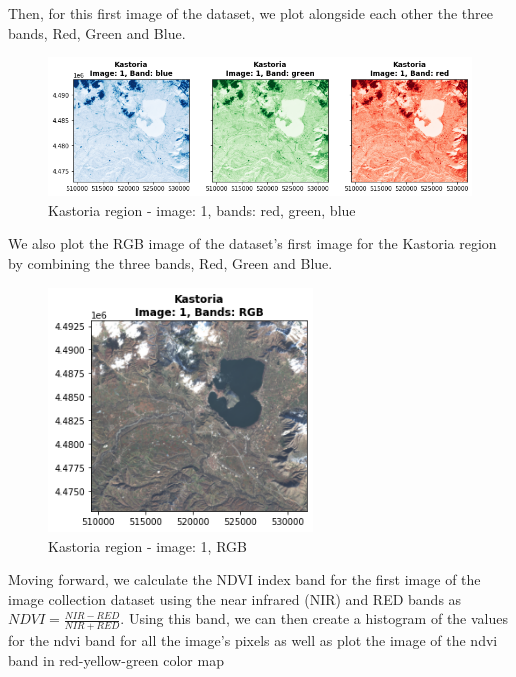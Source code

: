 Then, for this first image of the dataset, we plot alongside each other the three bands, Red, Green and Blue.

\begin{figure}[h]
    \centering
    \includegraphics[width=13cm]{figures/q2_1_rasterio_image1_rgb_bands.png}
    \caption{Kastoria region - image: 1, bands: red, green, blue}
    \label{fig:Kastoria region - image: 1, bands: red, green, blue}
\end{figure}
\FloatBarrier %

We also plot the RGB image of the dataset's first image for the Kastoria region by combining the three bands, Red, Green and Blue.

\begin{figure}[h]
    \centering
    \includegraphics[width=7cm]{figures/q2_1_rasterio_image1_rgb_image.png}
    \caption{Kastoria region - image: 1, RGB}
    \label{fig:Kastoria region - image: 1, RGB}
\end{figure}
\FloatBarrier %

Moving forward, we calculate the NDVI index band for the first image of the image collection dataset using the near infrared (NIR) and RED bands as $ NDVI = \frac{NIR-RED}{NIR+RED}$. Using this band, we can then create a histogram of the values for the ndvi band for all the image's pixels as well as plot the image of the ndvi band in  red-yellow-green color map

